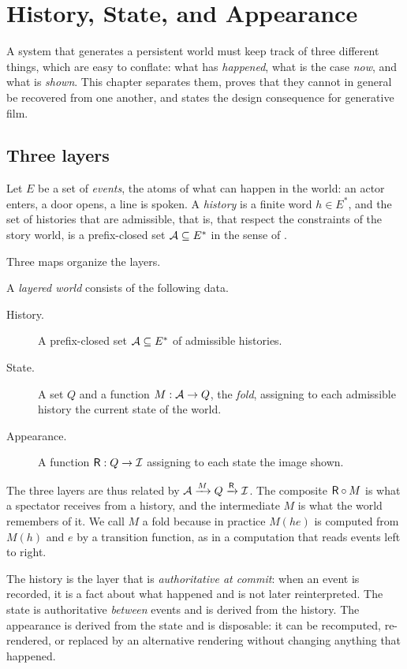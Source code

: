 \chapter{History, State, and Appearance}
\label{ch:layers}

A system that generates a persistent world must keep track of three different things, which are easy to conflate: what has \emph{happened}, what is the case \emph{now}, and what is \emph{shown}. This chapter separates them, proves that they cannot in general be recovered from one another, and states the design consequence for generative film.

\section{Three layers}

Let $E$ be a set of \emph{events}, the atoms of what can happen in the world: an actor enters, a door opens, a line is spoken. A \emph{history} is a finite word $h\in E^*$, and the set of histories that are admissible, that is, that respect the constraints of the story world, is a prefix-closed set $\mathcal{A}\subseteq E^*$ in the sense of .

Three maps organize the layers.

\begin{definition}[Layers]
A \emph{layered world} consists of the following data.
\begin{description}
\item[History.] A prefix-closed set $\mathcal{A}\subseteq E^*$ of admissible histories.
\item[State.] A set $Q$ and a function $M:\mathcal{A}\to Q$, the \emph{fold}, assigning to each admissible history the current state of the world.
\item[Appearance.] A function $\mathsf{R}:Q\to\mathcal{I}$ assigning to each state the image shown.
\end{description}
\end{definition}

The three layers are thus related by $\mathcal{A}\xrightarrow{M}Q\xrightarrow{\mathsf{R}}\mathcal{I}$. The composite $\mathsf{R}\circ M$ is what a spectator receives from a history, and the intermediate $M$ is what the world remembers of it. We call $M$ a fold because in practice $M(he)$ is computed from $M(h)$ and $e$ by a transition function, as in a computation that reads events left to right.

The history is the layer that is \emph{authoritative at commit}: when an event is recorded, it is a fact about what happened and is not later reinterpreted. The state is authoritative \emph{between} events and is derived from the history. The appearance is derived from the state and is disposable: it can be recomputed, re-rendered, or replaced by an alternative rendering without changing anything that happened.

